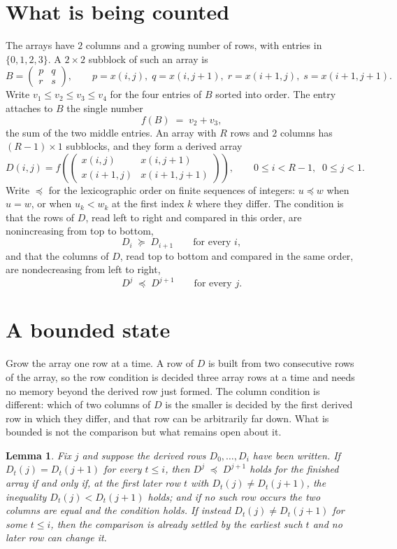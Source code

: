 \documentclass[11pt,a4paper]{article}
\theoremstyle{plain}
\newtheorem{lemma}[theorem]{Lemma}
\theoremstyle{definition}
\begin{document}
\section{What is being counted}

The arrays have $2$ columns and a growing number of rows, with entries in $\{0,1,2,3\}$. A
$2\times2$ subblock of such an array is
\[
B=\begin{pmatrix} p & q \\ r & s \end{pmatrix},
\qquad p=x(i,j),\; q=x(i,j+1),\; r=x(i+1,j),\; s=x(i+1,j+1).
\]
Write $v_1\le v_2\le v_3\le v_4$ for the four entries of $B$ sorted into order. The entry attaches to $B$ the single number
\[
f(B)\;=\;v_2+v_3,
\]
the sum of the two middle entries. An array with $R$ rows and $2$ columns has $(R-1)\times1$ subblocks, and they
form a derived array
\[
D(i,j)=f\!\left(\begin{pmatrix} x(i,j) & x(i,j+1) \\ x(i+1,j) & x(i+1,j+1)\end{pmatrix}
\right),\qquad 0\le i<R-1,\;\; 0\le j<1 .
\]
Write $\preceq$ for the lexicographic order on finite sequences of integers: $u\preceq w$ when
$u=w$, or when $u_k<w_k$ at the first index $k$ where they differ. The condition is that the
rows of $D$, read left to right and compared in this order, are nonincreasing from top to bottom,
\[
D_{i}\;\succeq\;D_{i+1}\qquad\text{for every } i,
\]
and that the columns of $D$, read top to bottom and compared in the same order, are nondecreasing
from left to right,
\[
D^{j}\;\preceq\;D^{j+1}\qquad\text{for every } j .
\]

\section{A bounded state}

Grow the array one row at a time. A row of $D$ is built from two consecutive rows of the array,
so the row condition is decided three array rows at a time and needs no memory beyond the
derived row just formed. The column condition is different: which of two columns of $D$ is the
smaller is decided by the first derived row in which they differ, and that row can be
arbitrarily far down. What is bounded is not the comparison but what remains open about it.

\begin{lemma}\label{lem:bits}
Fix $j$ and suppose the derived rows $D_0,\dots,D_i$ have been written. If $D_t(j)=D_t(j+1)$ for
every $t\le i$, then $D^{j}\;\preceq\;D^{j+1}$ holds for the finished array if and only if,
at the first later row $t$ with $D_t(j)\neq D_t(j+1)$, the inequality $D_t(j)<D_t(j+1)$
holds; and if no such row occurs the two columns are equal and the condition holds. If instead
$D_t(j)\neq D_t(j+1)$ for some $t\le i$, then the comparison is already settled by the earliest
such $t$ and no later row can change it.
\end{lemma}
\end{document}
